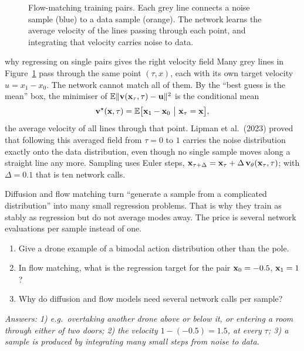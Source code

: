 \begin{figure}[h]
\centering
{}
\caption{Flow-matching training pairs. Each grey line connects a noise sample (blue) to a data sample (orange). The network learns the average velocity of the lines passing through each point, and integrating that velocity carries noise to data.}
\label{fig:flow}
\end{figure}

\begin{probbox}{why regressing on single pairs gives the right velocity field}
Many grey lines in Figure~\ref{fig:flow} pass through the same point $(\tau,x)$, each with its own target velocity $u=x_1-x_0$. The network cannot match all of them. By the ``best guess is the mean'' box, the minimiser of $\mathbb{E}\lVert\mathbf{v}(\mathbf{x}_\tau,\tau)-\mathbf{u}\rVert^2$ is the conditional mean
\[
\vect v^\star(\x,\tau)=\E\big[\x_1-\x_0\ \big|\ \x_\tau=\x\big],
\]
the average velocity of all lines through that point. Lipman et al.\ (2023) proved that following this averaged field from $\tau=0$ to $1$ carries the noise distribution exactly onto the data distribution, even though no single sample moves along a straight line any more. Sampling uses Euler steps, $\mathbf{x}_{\tau+\Delta}=\mathbf{x}_\tau+\Delta\,\mathbf{v}_\theta(\mathbf{x}_\tau,\tau)$; with $\Delta=0.1$ that is ten network calls.
\end{probbox}

\begin{plainbox}
Diffusion and flow matching turn ``generate a sample from a complicated distribution'' into many small regression problems. That is why they train as stably as regression but do not average modes away. The price is several network evaluations per sample instead of one.
\end{plainbox}

\begin{quizbox}
\begin{enumerate}[leftmargin=*]
\item Give a drone example of a bimodal action distribution other than the pole.
\item In flow matching, what is the regression target for the pair $\mathbf{x}_0=-0.5$, $\mathbf{x}_1=1$?
\item Why do diffusion and flow models need several network calls per sample?
\end{enumerate}
\emph{Answers: 1) e.g.\ overtaking another drone above or below it, or entering a room through either of two doors; 2) the velocity $1-(-0.5)=1.5$, at every $\tau$; 3) a sample is produced by integrating many small steps from noise to data.}
\end{quizbox}
